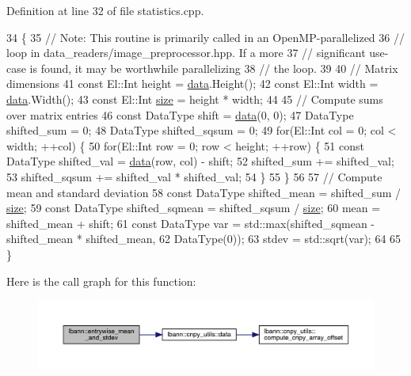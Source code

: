 Definition at line 32 of file statistics.\+cpp.


\begin{DoxyCode}
34                                                \{
35   \textcolor{comment}{// Note: This routine is primarily called in an OpenMP-parallelized}
36   \textcolor{comment}{// loop in data\_readers/image\_preprocessor.hpp. If a more}
37   \textcolor{comment}{// significant use-case is found, it may be worthwhile parallelizing}
38   \textcolor{comment}{// the loop.}
39 
40   \textcolor{comment}{// Matrix dimensions}
41   \textcolor{keyword}{const} El::Int height = \hyperlink{namespacelbann_1_1cnpy__utils_a9ac86d96ccb1f8b4b2ea16441738781f}{data}.Height();
42   \textcolor{keyword}{const} El::Int width = \hyperlink{namespacelbann_1_1cnpy__utils_a9ac86d96ccb1f8b4b2ea16441738781f}{data}.Width();
43   \textcolor{keyword}{const} El::Int \hyperlink{structc__hash__table_afd5bfd9640fc5b72f75457fb7dd89663}{size} = height * width;
44 
45   \textcolor{comment}{// Compute sums over matrix entries}
46   \textcolor{keyword}{const} DataType shift = \hyperlink{namespacelbann_1_1cnpy__utils_a9ac86d96ccb1f8b4b2ea16441738781f}{data}(0, 0);
47   DataType shifted\_sum = 0;
48   DataType shifted\_sqsum = 0;
49   \textcolor{keywordflow}{for}(El::Int col = 0; col < width; ++col) \{
50     \textcolor{keywordflow}{for}(El::Int row = 0; row < height; ++row) \{
51       \textcolor{keyword}{const} DataType shifted\_val = \hyperlink{namespacelbann_1_1cnpy__utils_a9ac86d96ccb1f8b4b2ea16441738781f}{data}(row, col) - shift;
52       shifted\_sum += shifted\_val;
53       shifted\_sqsum += shifted\_val * shifted\_val;
54     \}
55   \}
56 
57   \textcolor{comment}{// Compute mean and standard deviation}
58   \textcolor{keyword}{const} DataType shifted\_mean = shifted\_sum / \hyperlink{structc__hash__table_afd5bfd9640fc5b72f75457fb7dd89663}{size};
59   \textcolor{keyword}{const} DataType shifted\_sqmean = shifted\_sqsum / \hyperlink{structc__hash__table_afd5bfd9640fc5b72f75457fb7dd89663}{size};
60   mean = shifted\_mean + shift;
61   \textcolor{keyword}{const} DataType var = std::max(shifted\_sqmean - shifted\_mean * shifted\_mean,
62                                 DataType(0));
63   stdev = std::sqrt(var);
64 
65 \}
\end{DoxyCode}
Here is the call graph for this function\+:\nopagebreak
\begin{figure}[H]
\begin{center}
\leavevmode
\includegraphics[width=350pt]{namespacelbann_a604ae9da0173b8be2bfb6877997d6d5c_cgraph}
\end{center}
\end{figure}
